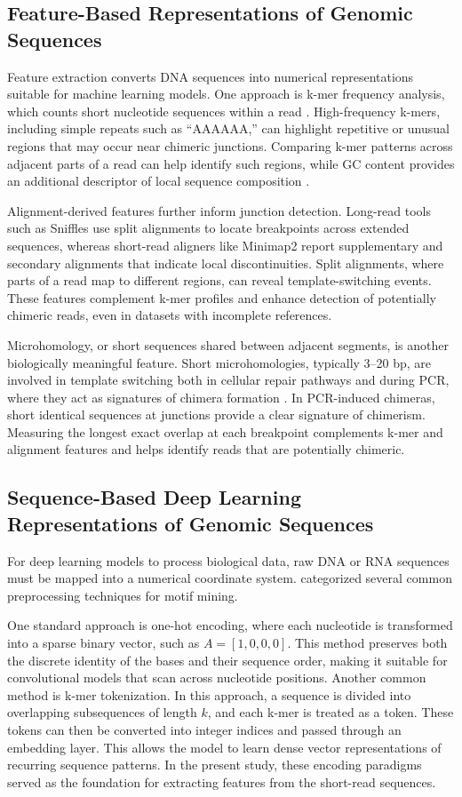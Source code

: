 \subsection{Feature-Based Representations of Genomic Sequences}
Feature extraction converts DNA sequences into numerical representations suitable for machine learning models. One approach is k-mer frequency analysis, which counts short nucleotide sequences within a read \citep{Vervier2015}. High-frequency k-mers, including simple repeats such as “AAAAAA,” can highlight repetitive or unusual regions that may occur near chimeric junctions. Comparing k-mer patterns across adjacent parts of a read can help identify such regions, while GC content provides an additional descriptor of local sequence composition \citep{Ren2020}.

Alignment-derived features further inform junction detection. Long-read tools such as Sniffles \citep{Sedlazeck2018} use split alignments to locate breakpoints across extended sequences, whereas short-read aligners like Minimap2 \citep{Li2018} report supplementary and secondary alignments that indicate local discontinuities. Split alignments, where parts of a read map to different regions, can reveal template-switching events. These features complement k-mer profiles and enhance detection of potentially chimeric reads, even in datasets with incomplete references.

Microhomology, or short sequences shared between adjacent segments, is another biologically meaningful feature. Short microhomologies, typically 3--20 bp, are involved in template switching both in cellular repair pathways and during PCR, where they act as signatures of chimera formation \citep{Sfeir2015,Peccoud2018}. In PCR-induced chimeras, short identical sequences at junctions provide a clear signature of chimerism. Measuring the longest exact overlap at each breakpoint complements k-mer and alignment features and helps identify reads that are potentially chimeric.

\subsection{Sequence-Based Deep Learning Representations of Genomic Sequences}
For deep learning models to process biological data, raw DNA or RNA sequences must be mapped into a numerical coordinate system. \citet{He2021} categorized several common preprocessing techniques for motif mining.

One standard approach is one-hot encoding, where each nucleotide is transformed into a sparse binary vector, such as \(A = [1, 0, 0, 0]\). This method preserves both the discrete identity of the bases and their sequence order, making it suitable for convolutional models that scan across nucleotide positions. Another common method is k-mer tokenization. In this approach, a sequence is divided into overlapping subsequences of length \(k\), and each k-mer is treated as a token. These tokens can then be converted into integer indices and passed through an embedding layer. This allows the model to learn dense vector representations of recurring sequence patterns. In the present study, these encoding paradigms served as the foundation for extracting features from the short-read sequences.

